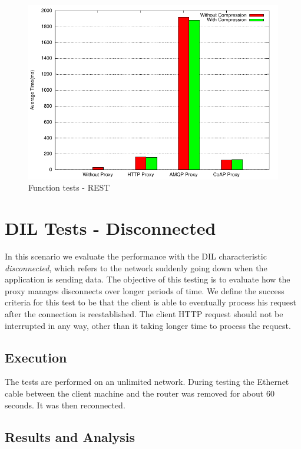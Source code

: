 \begin{figure}[H]
\center
\includegraphics[scale=0.75]{../results/function_tests/rest/result.pdf}
\caption{Function tests - REST}
\end{figure}


\section{DIL Tests - Disconnected}

In this scenario we evaluate  the performance with the DIL characteristic
\textit{disconnected}, which refers to the network suddenly going down when the
application is sending data. The objective of this testing is to evaluate how
the proxy manages disconnects over longer periods of time. We define the success
criteria for this test to be that the client is able to eventually process his
request after the connection is reestablished. The client HTTP request should
not be interrupted in any way, other than it taking longer time to process the
request.

\subsection{Execution}

 The tests are performed on an unlimited network. During testing the Ethernet
 cable between the client machine and the router was removed for about 60
 seconds. It was then reconnected.

\subsection{Results and Analysis}

